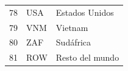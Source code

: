 \begin{longtable}{lll}
	78 & USA    & Estados Unidos                       \\
	79 & VNM    & Vietnam                              \\
	80 & ZAF    & Sudáfrica                            \\
	81 & ROW    & Resto del mundo                      \\
	\hline
\end{longtable}




